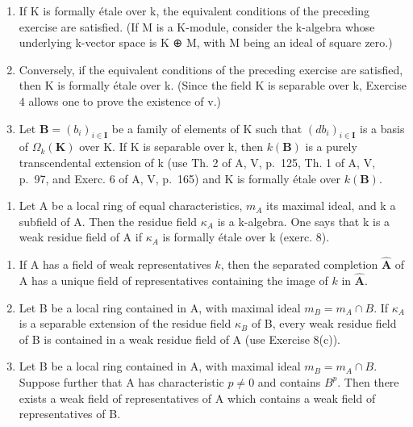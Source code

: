 \begin{enumerate}
\def\labelenumi{\alph{enumi})}
\item
  If K is formally étale over k, the equivalent conditions of the preceding exercise are satisfied. (If M is a K-module, consider the k-algebra whose underlying k-vector space is K ⊕ M, with M being an ideal of square zero.)
\item
  Conversely, if the equivalent conditions of the preceding exercise are satisfied, then K is formally étale over k. (Since the field K is separable over k, Exercise 4 allows one to prove the existence of v.)
\item
  Let \(\mathbf{B} = (b_{i})_{i\in\mathbf{I}}\) be a family of elements of K such that \((db_{i})_{i\in\mathbf{I}}\) is a basis of \(\Omega_{k}(\mathbf{K})\) over K. If K is separable over k, then \(k(\mathbf{B})\) is a purely transcendental extension of k (use Th. 2 of A, V, p.~125, Th. 1 of A, V, p.~97, and Exerc. 6 of A, V, p.~165) and K is formally étale over \(k(\mathbf{B})\).
\end{enumerate}

\begin{enumerate}
\def\labelenumi{\arabic{enumi})}
\setcounter{enumi}{8}
\tightlist
\item
  Let A be a local ring of equal characteristics, \(m_{A}\) its maximal ideal, and k a subfield of A. Then the residue field \(\kappa_{A}\) is a k-algebra. One says that k is a weak residue field of A if \(\kappa_{A}\) is formally étale over k (exerc. 8).
\end{enumerate}

\begin{enumerate}
\def\labelenumi{\alph{enumi})}
\item
  If A has a field of weak representatives \(k\), then the separated completion \(\hat{\mathbf{A}}\) of A has a unique field of representatives containing the image of \(k\) in \(\hat{\mathbf{A}}\).
\item
  Let B be a local ring contained in A, with maximal ideal \(m_{B} = m_{A} \cap B\). If \(\kappa_{A}\) is a separable extension of the residue field \(\kappa_{B}\) of B, every weak residue field of B is contained in a weak residue field of A (use Exercise 8(c)).
\item
  Let B be a local ring contained in A, with maximal ideal \(m_{B} = m_{A} \cap B\). Suppose further that A has characteristic \(p\ne0\) and contains \(B^{p}\). Then there exists a weak field of representatives of A which contains a weak field of representatives of B.
\end{enumerate}
\relax{}
